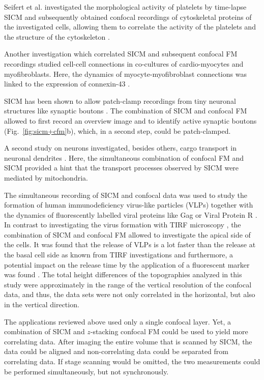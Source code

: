 Seifert et al. investigated the morphological activity of
platelets by time-lapse SICM and subsequently obtained confocal recordings of
cytoskeletal proteins of the investigated cells, allowing them to correlate
the activity of the platelets and the structure of the cytoskeleton
\cite{Seifert2017}.

Another investigation which correlated SICM and subsequent confocal FM
recordings studied cell-cell connections in co-cultures of cardio-myocytes and
myofibroblasts. Here, the dynamics of myocyte-myofibroblast connections was
linked to the expression of connexin-43 \cite{Schultz2019}.


SICM has been shown to allow patch-clamp recordings from tiny neuronal
structures like synaptic boutons \cite{Novak2013}. The combination of SICM and
confocal FM allowed to first record an overview image and to identify active
synaptic boutons (Fig.~\ref{fig:sicm+cfm}b), which, in a second step, could be
patch-clamped.

A second study on neurons investigated, besides others, cargo transport in
neuronal dendrites \cite{Takahashi2019}. Here, the simultaneous combination of
confocal FM and SICM provided a hint that the transport processes observed by
SICM were mediated by mitochondria.

The simultaneous recording of SICM and confocal data was used to study the
formation of human immunodeficiency virus-like particles (VLPs) together with
the dynamics of fluorescently labelled viral proteins like Gag or Viral
Protein R \cite{Bednarska2020}. In contrast to investigating the virus
formation with TIRF microscopy \cite{Jouvenet2008}, the combination of SICM
and confocal FM allowed to investigate the apical side of the cells. It was
found that the release of VLPs is a lot faster than the release at the basal
cell side as known from TIRF investigations and furthermore, a potential
impact on the release time by the application of a fluorescent marker was
found \cite{Bednarska2020}. The total height differences of the topographies
analyzed in this study were approximately in the range of the vertical
resolution of the confocal data, and thus, the data sets were not only
correlated in the horizontal, but also in the vertical direction.

The applications reviewed above used only a single confocal layer. Yet,
a combination of SICM and $z$-stacking confocal FM could be used to yield more
correlating data. After imaging the entire volume that is scanned by SICM, the
data could be aligned and non-correlating data could be separated from
correlating data. If stage scanning would be omitted, the two measurements
could be performed simultaneously, but not synchronously.  


